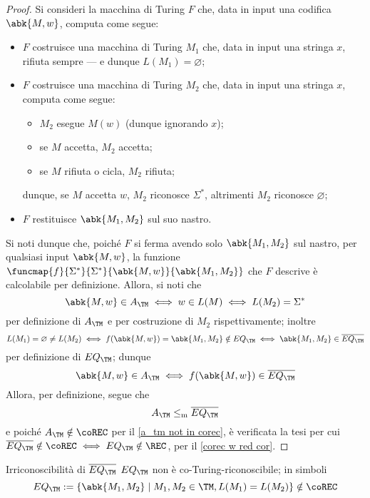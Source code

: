 \documentclass[a4paper, 12pt]{report}
\begin{document}
    \begin{proof}
        Si consideri la macchina di Turing $F$ che, data in input una codifica $\abk{M, w}$, computa come segue:

        \begin{itemize}
            \item $F$ costruisce una macchina di Turing $M_1$ che, data in input una stringa $x$, rifiuta sempre --- e dunque $L(M_1) = \varnothing$;
            \item $F$ costruisce una macchina di Turing $M_2$ che, data in input una stringa $x$, computa come segue:
                \begin{itemize}
                    \item $M_2$ esegue $M(w)$ (dunque ignorando $x$);
                    \item se $M$ accetta, $M_2$ accetta;
                    \item se $M$ rifiuta o cicla, $M_2$ rifiuta;
                \end{itemize}
                dunque, se $M$ accetta $w$, $M_2$ riconosce $\Sigma^*$, altrimenti $M_2$ riconosce $\varnothing$;
            \item $F$ restituisce $\abk{M_1, M_2}$ sul suo nastro.
        \end{itemize}

        Si noti dunque che, poiché $F$ si ferma avendo solo $\abk{M_1, M_2}$ sul nastro, per qualsiasi input $\abk{M, w}$, la funzione $\funcmap{f}{\Sigma^*}{\Sigma^*}{\abk{M, w}}{\abk{M_1, M_2}}$ che $F$ descrive è calcolabile per definizione. Allora, si noti che $$\abk{M, w} \in A_\TM \iff w \in L(M) \iff L(M_2) = \Sigma ^*$$ per definizione di $A_\TM$ e per costruzione di $M_2$ rispettivamente; inoltre $$L(M_1) = \varnothing \neq L(M_2) \iff f(\abk{M, w}) = \abk{M_1, M_2} \notin EQ_\TM \iff \abk{M_1, M_2} \in \overline{EQ_\TM}$$ per definizione di $EQ_\TM$; dunque $$\abk{M, w} \in A_\TM \iff f(\abk{M, w}) \in \overline{EQ_\TM}$$ Allora, per definizione, segue che $$A_\TM \leq_\mathrm m \overline{EQ_\TM}$$ e poiché $A_\TM \notin \coREC$ per il \cref{a_tm not in corec}, è verificata la tesi per cui $\overline{EQ_\TM} \notin \coREC \iff EQ_\TM \notin \REC$, per il \cref{corec w red cor}.
    \end{proof}

    \begin{framedthm}{Irriconoscibilità di $\overline{EQ_\TM}$}
        $EQ_\TM$ non è co-Turing-riconoscibile; in simboli $$EQ_\TM := \{\abk{M_1, M_2} \mid M_1, M_2 \in \TM, L(M_1) = L(M_2)\} \notin \coREC$$
    \end{framedthm}
\end{document}

